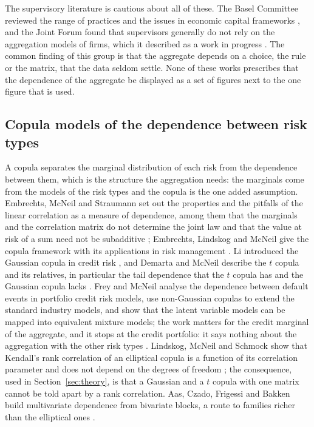 The supervisory literature is cautious about all of these. The Basel Committee reviewed the range of practices and the issues in
economic capital frameworks \citep{bcbs2009}, and the Joint Forum found that supervisors generally do not rely on the aggregation
models of firms, which it described as a work in progress \citep{jointforum2010}. The common finding of this group is that the
aggregate depends on a choice, the rule or the matrix, that the data seldom settle. None of these works prescribes that the
dependence of the aggregate be displayed as a set of figures next to the one figure that is used.

\subsection{Copula models of the dependence between risk types}
\label{sec:rw-copulas}

A copula separates the marginal distribution of each risk from the dependence between them, which is the structure the aggregation
needs: the marginals come from the models of the risk types and the copula is the one added assumption. Embrechts, McNeil and
Straumann set out the properties and the pitfalls of the linear correlation as a measure of dependence, among them that the
marginals and the correlation matrix do not determine the joint law and that the value at risk of a sum need not be subadditive
\citep{ems2002}; Embrechts, Lindskog and McNeil give the copula framework with its applications in risk management
\citep{elm2003}. Li introduced the Gaussian copula in credit risk \citep{li2000}, and Demarta and McNeil describe the $t$ copula
and its relatives, in particular the tail dependence that the $t$ copula has and the Gaussian copula lacks \citep{demarta2005}.
Frey and McNeil analyse the dependence between default events in portfolio credit risk models, use non-Gaussian copulas to extend
the standard industry models, and show that the latent variable models can be mapped into equivalent mixture models; the
work matters for the credit marginal of the aggregate, and it stops at the credit portfolio: it says nothing about the aggregation
with the other risk types \citep{frey2003}. Lindskog, McNeil and Schmock show that Kendall's rank
correlation of an elliptical copula is a function of its correlation parameter and does not depend on the degrees of freedom
\citep{lindskog2003}; the consequence, used in Section~\ref{sec:theory}, is that a Gaussian and a $t$ copula with one matrix
cannot be told apart by a rank correlation. Aas, Czado, Frigessi and Bakken build multivariate dependence from bivariate blocks, a
route to families richer than the elliptical ones \citep{aas2009}.

